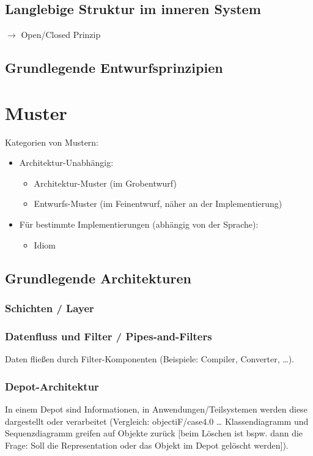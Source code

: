 \documentclass{scrreprt}
\begin{document}
\section{Langlebige Struktur im inneren System}
$\to$ Open/Closed Prinzip
\section{Grundlegende Entwurfsprinzipien}

\chapter{Muster}
Kategorien von Mustern:
\begin{itemize}
\item Architektur-Unabhängig:
\begin{itemize}
\item Architektur-Muster (im Grobentwurf)
\item Entwurfs-Muster (im Feinentwurf, näher an der Implementierung)
\end{itemize}
\item Für bestimmte Implementierungen (abhängig von der Sprache):
\begin{itemize}
\item Idiom
\end{itemize}
\end{itemize}

\section{Grundlegende Architekturen}
\subsection{Schichten / Layer}

\subsection{Datenfluss und Filter / Pipes-and-Filters}
Daten fließen durch Filter-Komponenten (Beispiele: Compiler, Converter, …).

\subsection{Depot-Architektur}
In einem Depot sind Informationen, in Anwendungen/Teilsystemen werden diese dargestellt oder verarbeitet (Vergleich: objectiF/case4.0 … Klassendiagramm und Sequenzdiagramm greifen auf Objekte zurück [beim Löschen ist bspw. dann die Frage: Soll die Representation oder das Objekt im Depot gelöscht werden]).
\end{document}

